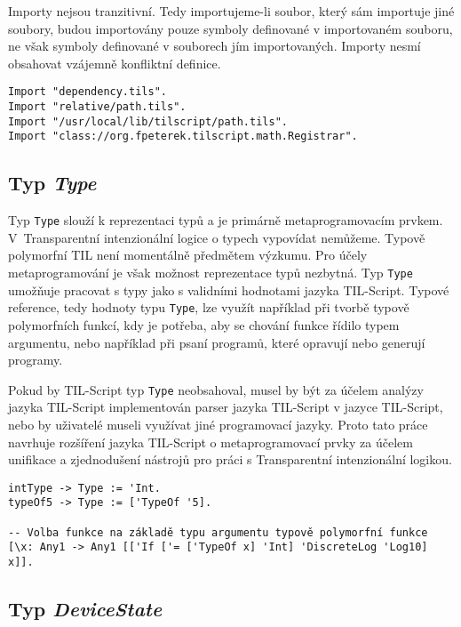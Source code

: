 Importy nejsou tranzitivní. Tedy importujeme-li soubor, který sám importuje jiné soubory, budou
importovány pouze symboly definované v importovaném souboru, ne však symboly definované v souborech
jím importovaných. Importy nesmí obsahovat vzájemně konfliktní definice.

\begin{lstlisting}[caption={Příklad využití výrazů Import}]
Import "dependency.tils".
Import "relative/path.tils".
Import "/usr/local/lib/tilscript/path.tils".
Import "class://org.fpeterek.tilscript.math.Registrar".
\end{lstlisting}

\subsection{Typ \textit{Type}}

Typ \lstinline{Type} slouží k reprezentaci typů a je primárně metaprogramovacím prvkem.
V~Transparentní intenzionální logice o typech vypovídat nemůžeme. Typově polymorfní TIL není
momentálně předmětem výzkumu. Pro účely metaprogramování je však možnost reprezentace typů
nezbytná. Typ \lstinline{Type} umožňuje pracovat s typy jako s validními hodnotami jazyka
TIL-Script. Typové reference, tedy hodnoty typu \lstinline{Type}, lze využít například při tvorbě
typově polymorfních funkcí, kdy je potřeba, aby se chování funkce řídilo typem argumentu, nebo
například při psaní programů, které opravují nebo generují programy.

Pokud by TIL-Script typ \lstinline{Type} neobsahoval, musel by být za účelem analýzy jazyka
TIL-Script implementován parser jazyka TIL-Script v jazyce TIL-Script, nebo by uživatelé museli
využívat jiné programovací jazyky. Proto tato práce navrhuje rozšíření jazyka TIL-Script
o metaprogramovací prvky za účelem unifikace a zjednodušení nástrojů pro práci s Transparentní
intenzionální logikou.

\begin{lstlisting}[caption={Příklad využití typových referencí}]
intType -> Type := 'Int.
typeOf5 -> Type := ['TypeOf '5].

-- Volba funkce na základě typu argumentu typově polymorfní funkce
[\x: Any1 -> Any1 [['If ['= ['TypeOf x] 'Int] 'DiscreteLog 'Log10] x]].
\end{lstlisting}

\subsection{Typ \textit{DeviceState}}

